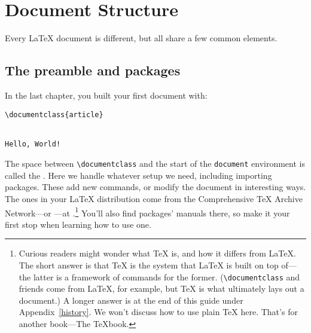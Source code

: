 \chapter{Document Structure}
\label{structure}

Every \LaTeX{} document is different,
but all share a few common elements.

\section{The preamble and packages}
In the last chapter, you built your first document with:
\begin{leftfigure}
\begin{lstlisting}
\documentclass{article}


Hello, World!

\end{lstlisting}
\end{leftfigure}
The space between \verb|\documentclass| and the start of the
\texttt{document} environment is called the .
Here we handle whatever setup we need, including importing packages.
These add new commands, or modify the document in interesting ways.
The ones in your \LaTeX{} distribution come from the Comprehensive \TeX{}
Archive Network---or ---at .\punckern\footnote{%
Curious readers might wonder what \TeX{} is, and how it differs from \LaTeX.
The short answer is that \TeX{} is the system that \LaTeX{}
is built on top of---the latter is a framework of commands for the former.
(\texttt{\textbackslash documentclass} and friends come from
\LaTeX{}, for example, but \TeX{} is what ultimately lays out a document.)
A longer answer is at the end of this guide under Appendix~\ref{history}.
We won't discuss how to use plain \TeX{} here. That's for another book---The
\TeX book.}
You'll also find packages' manuals there,
so make it your first stop when learning how to use one.

